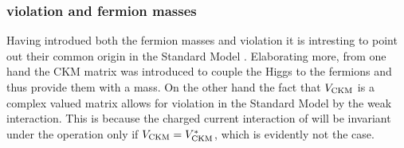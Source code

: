 \subsubsection{\CP violation and fermion masses}
Having introdued both the fermion masses and \CP violation it is intresting to point out their common origin in
the Standard Model \cite{KM-mechanism}. Elaborating more, from one hand the CKM matrix was introduced to couple
the Higgs to the fermions and thus provide them with a mass. On the other hand the fact that $V_{\rm CKM}$ is a
complex valued matrix allows for \CP violation in the Standard Model by the weak interaction. This is because
the charged current interaction of  will be invariant under the \CP operation only
if $V_{\rm CKM}=V_{\rm CKM}^*$, which is evidently not the case.
